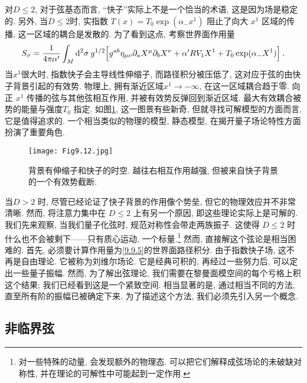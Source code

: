 对$D \leq 2$, 对于弦基态而言, ``快子''实际上不是一个恰当的术语, 这是因为场是稳定的. 
另外, 当$D \leq 2$时, 实指数 $T(x)=T_{0} \exp (\alpha_{-} x^{1})$ 阻止了向大 $x^{1}$ 区域的传播, 这一区域的耦合是发散的. 
为了看到这点, 考察世界面作用量
\begin{equation}
	S_{\sigma} = \frac{1}{4 \pi \alpha^{\prime}} \int_{M} \mathrm{d}^{2} \sigma \: g^{1/2} \Bigl[g^{ab} \eta_{\mu\nu} 
	\partial_{a} X^{\mu} \partial_{b} X^{\nu} + \alpha^{\prime} R V_{1} X^{1} + T_{0} \exp (\alpha_{-} X^{1})\Bigr] \:. \label{9.9.5}
\end{equation}
当$x^{1}$很大时, 指数快子会主导线性伸缩子, 而路径积分被压低了, 这对应于弦的由快子背景引起的有效势. 
物理上, 拥有渐近区域$x^{1} \rightarrow-\infty$, 在这一区域耦合趋于零. 向正 $x^{1}$ 传播的弦与其他弦相互作用, 并被有效势反弹回到渐近区域. 
最大有效耦合被势的能量与强度$T_{0}$ 指定. 如图\ref{Fig9.12}, 这一图景有些新奇, 但就寻找可解模型的方面而言, 它是值得追求的. 
一个相当类似的物理的模型, 静态模型, 在揭开量子场论特性方面扮演了重要角色.

\begin{figure}[h]
	\begin{center}
		\texttt{[image: Fig9.12.jpg]}\\
		\caption{背景有伸缩子和快子的时空. 越往右相互作用越强, 但被来自快子背景的一个有效势截断.}\label{Fig9.12}
	\end{center}
\end{figure}
\vspace*{-0.7cm}

当$D>2$ 时, 尽管已经论证了快子背景的作用像个势垒, 但它的物理效应并不非常清晰. 
然而, 将注意力集中在 $D \leq 2$ 上有另一个原因, 即这些理论实际上是可解的. 我们先来观察, 当我们量子化弦时, 规范对称性会带走两族振子. 
这使得 $D \leq 2$ 时什么也不会被剩下——只有质心运动, 一个标量.\footnote{对一些特殊的动量, 会发现额外的物理态. 可以把它们解释成弦场论的未破缺对称性, 
并在理论的可解性中可能起到一定作用.} 然而, 直接解这个弦论是相当困难的. 首先, 必须要计算作用量为\eqref{9.9.5}的世界面路径积分. 
由于指数快子场, 这不再是自由理论. 它被称为刘维尔场论. 它是经典可积的, 再经过一些努力后, 可以定出一些量子振幅. 
然而, 为了解出弦理论, 我们需要在黎曼面模空间的每个亏格上积这个结果; 我们已经看到这是一个紧致空间. 
相当显著的是, 通过相当不同的方法, 直至所有阶的振幅已被确定下来. 为了描述这个方法, 我们必须先引入另一个概念.

\subsection*{非临界弦}

